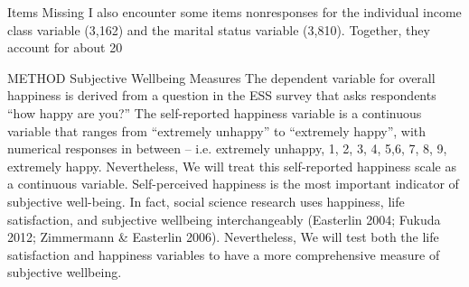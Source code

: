 Items Missing 
I also encounter some items nonresponses for the individual income class variable (3,162) and the marital status variable (3,810). Together, they account for about 20%

METHOD
Subjective Wellbeing Measures
The dependent variable for overall happiness is derived from a question in the ESS survey that asks respondents “how happy are you?” The self-reported happiness variable is a continuous variable that ranges from “extremely unhappy” to “extremely happy”, with numerical responses in between – i.e. extremely unhappy, 1, 2, 3, 4, 5,6, 7, 8, 9, extremely happy. Nevertheless, We will treat this self-reported happiness scale as a continuous variable. Self-perceived happiness is the most important indicator of subjective well-being. In fact, social science research uses happiness, life satisfaction, and subjective wellbeing interchangeably (Easterlin 2004; Fukuda 2012; Zimmermann & Easterlin 2006). Nevertheless, We will test both the life satisfaction and happiness variables to have a more comprehensive measure of subjective wellbeing.

